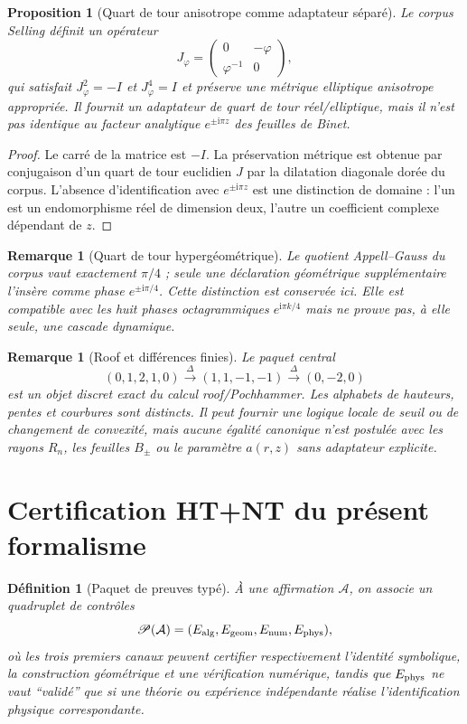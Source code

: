 \documentclass[11pt,a4paper]{article}
\newtheorem{proposition}[theorem]{Proposition}
\newtheorem{definition}[theorem]{Définition}
\newtheorem{remark}[theorem]{Remarque}
\newcommand{\ii}{\mathrm i}
\newcommand{\ph}{\varphi}
\begin{document}
\begin{proposition}[Quart de tour anisotrope comme adaptateur séparé]
Le corpus Selling définit un opérateur
\[
 J_\ph=\begin{pmatrix}0&-\ph\\ \ph^{-1}&0\end{pmatrix},
\]
qui satisfait $J_\ph^2=-I$ et $J_\ph^4=I$ et préserve une métrique elliptique anisotrope appropriée. Il fournit un adaptateur de quart de tour réel/elliptique, mais il n'est pas identique au facteur analytique $e^{\pm\ii\pi z}$ des feuilles de Binet.
\end{proposition}

\begin{proof}
Le carré de la matrice est $-I$. La préservation métrique est obtenue par conjugaison d'un quart de tour euclidien $J$ par la dilatation diagonale dorée du corpus. L'absence d'identification avec $e^{\pm\ii\pi z}$ est une distinction de domaine : l'un est un endomorphisme réel de dimension deux, l'autre un coefficient complexe dépendant de $z$.
\end{proof}

\begin{remark}[Quart de tour hypergéométrique]
Le quotient Appell--Gauss du corpus vaut exactement $\pi/4$ ; seule une déclaration géométrique supplémentaire l'insère comme phase $e^{\pm\ii\pi/4}$. Cette distinction est conservée ici. Elle est compatible avec les huit phases octagrammiques $e^{\ii\pi k/4}$ mais ne prouve pas, à elle seule, une cascade dynamique.
\end{remark}

\begin{remark}[Roof et différences finies]
Le paquet central
\[
 (0,1,2,1,0)\xrightarrow{\Delta}(1,1,-1,-1)
 \xrightarrow{\Delta}(0,-2,0)
\]
est un objet discret exact du calcul roof/Pochhammer. Les alphabets de hauteurs, pentes et courbures sont distincts. Il peut fournir une logique locale de seuil ou de changement de convexité, mais aucune égalité canonique n'est postulée avec les rayons $R_n$, les feuilles $B_\pm$ ou le paramètre $a(r,z)$ sans adaptateur explicite.
\end{remark}

\section{Certification HT+NT du présent formalisme}

\begin{definition}[Paquet de preuves typé]
À une affirmation $\mathcal A$, on associe un quadruplet de contrôles
\[
 \mathscr P(\mathcal A)=(E_{\rm alg},E_{\rm geom},E_{\rm num},E_{\rm phys}),
\]
où les trois premiers canaux peuvent certifier respectivement l'identité symbolique, la construction géométrique et une vérification numérique, tandis que $E_{\rm phys}$ ne vaut ``validé'' que si une théorie ou expérience indépendante réalise l'identification physique correspondante.
\end{definition}
\end{document}

